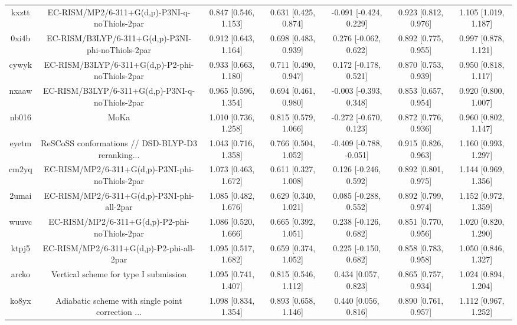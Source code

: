 \documentclass{article}
\begin{document}
\begin{center}
\begin{longtable}{|ccccccc|}
 kxztt &      EC-RISM/MP2/6-311+G(d,p)-P3NI-q-noThiols-2par &  0.847 [0.546, 1.153] &  0.631 [0.425, 0.874] &   -0.091 [-0.424, 0.229] &  0.923 [0.812, 0.976] &   1.105 [1.019, 1.187] \\
 0xi4b &  EC-RISM/B3LYP/6-311+G(d,p)-P3NI-phi-noThiols-2par &  0.912 [0.643, 1.164] &  0.698 [0.483, 0.939] &    0.276 [-0.062, 0.622] &  0.892 [0.775, 0.955] &   0.997 [0.878, 1.121] \\
 cywyk &    EC-RISM/B3LYP/6-311+G(d,p)-P2-phi-noThiols-2par &  0.933 [0.663, 1.180] &  0.711 [0.490, 0.947] &    0.172 [-0.178, 0.521] &  0.870 [0.753, 0.939] &   0.950 [0.818, 1.117] \\
 nxaaw &    EC-RISM/B3LYP/6-311+G(d,p)-P3NI-q-noThiols-2par &  0.965 [0.596, 1.354] &  0.694 [0.461, 0.980] &   -0.003 [-0.393, 0.348] &  0.853 [0.657, 0.954] &   0.920 [0.800, 1.007] \\
 nb016 &                                               MoKa &  1.010 [0.736, 1.258] &  0.815 [0.579, 1.066] &   -0.272 [-0.670, 0.123] &  0.872 [0.776, 0.936] &   0.960 [0.802, 1.147] \\
 eyetm &  ReSCoSS conformations // DSD-BLYP-D3 reranking... &  1.043 [0.716, 1.358] &  0.766 [0.504, 1.052] &  -0.409 [-0.788, -0.051] &  0.915 [0.826, 0.963] &   1.160 [0.993, 1.297] \\
 cm2yq &    EC-RISM/MP2/6-311+G(d,p)-P3NI-phi-noThiols-2par &  1.073 [0.463, 1.672] &  0.611 [0.327, 1.008] &    0.126 [-0.246, 0.592] &  0.892 [0.801, 0.975] &   1.144 [0.969, 1.356] \\
 2umai &         EC-RISM/MP2/6-311+G(d,p)-P3NI-phi-all-2par &  1.085 [0.482, 1.676] &  0.629 [0.340, 1.021] &    0.085 [-0.288, 0.552] &  0.892 [0.799, 0.974] &   1.152 [0.972, 1.359] \\
 wuuvc &      EC-RISM/MP2/6-311+G(d,p)-P2-phi-noThiols-2par &  1.086 [0.520, 1.666] &  0.665 [0.392, 1.051] &    0.238 [-0.126, 0.682] &  0.851 [0.770, 0.956] &   1.020 [0.820, 1.290] \\
 ktpj5 &           EC-RISM/MP2/6-311+G(d,p)-P2-phi-all-2par &  1.095 [0.517, 1.682] &  0.659 [0.374, 1.052] &    0.225 [-0.150, 0.682] &  0.858 [0.783, 0.958] &   1.050 [0.846, 1.327] \\
 arcko &              Vertical scheme for type I submission &  1.095 [0.741, 1.407] &  0.815 [0.546, 1.112] &     0.434 [0.057, 0.823] &  0.865 [0.757, 0.934] &   1.024 [0.894, 1.204] \\
 ko8yx &  Adiabatic scheme with single point correction ... &  1.098 [0.834, 1.354] &  0.893 [0.658, 1.146] &     0.440 [0.056, 0.816] &  0.890 [0.761, 0.957] &   1.112 [0.967, 1.252] \\

\end{longtable}
\end{center}
\end{document}
